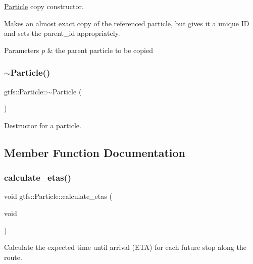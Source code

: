 \hyperlink{classgtfs_1_1Particle}{Particle} copy constructor.

Makes an almost exact copy of the referenced particle, but gives it a unique ID and sets the parent\+\_\+id appropriately.


\begin{DoxyParams}{Parameters}
{\em p} & the parent particle to be copied \\
\hline
\end{DoxyParams}
\mbox{\label{classgtfs_1_1Particle_a3accf3496ad8460b4ad8b3f6da2de411}} 
\subsubsection{\texorpdfstring{$\sim$\+Particle()}{~Particle()}}
{\footnotesize\ttfamily gtfs\+::\+Particle\+::$\sim$\+Particle (\begin{DoxyParamCaption}{ }\end{DoxyParamCaption})}

Destructor for a particle. 

\subsection{Member Function Documentation}
\mbox{\label{classgtfs_1_1Particle_aa71d322362f6eb431f70f78cdc8887a8}} 
\subsubsection{\texorpdfstring{calculate\+\_\+etas()}{calculate\_etas()}}
{\footnotesize\ttfamily void gtfs\+::\+Particle\+::calculate\+\_\+etas (\begin{DoxyParamCaption}\item[{void}]{ }\end{DoxyParamCaption})}

Calculate the expected time until arrival (E\+TA) for each future stop along the route. \mbox{\label{classgtfs_1_1Particle_a88627efbe0eb2e289315ae82627d3a39}} 
